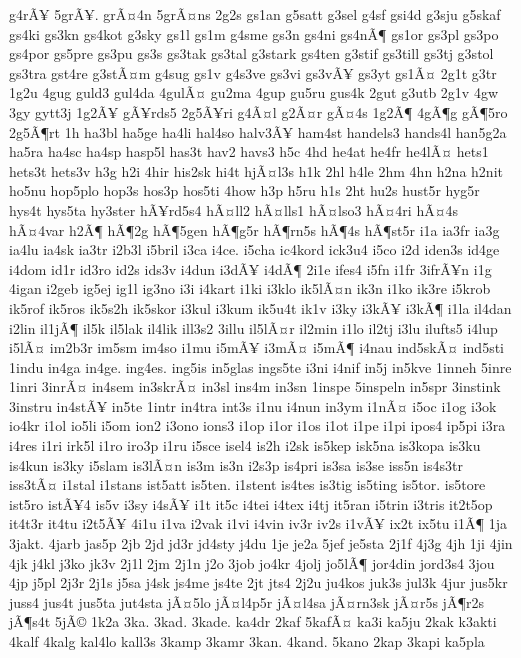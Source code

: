 {g4rÃ¥
5grÃ¥.
grÃ¤4n
5grÃ¤ns
2g2s
gs1an
g5satt
g3sel
g4sf
gsi4d
g3sju
g5skaf
gs4ki
gs3kn
gs4kot
g3sky
gs1l
gs1m
g4sme
gs3n
gs4ni
gs4nÃ¶
gs1or
gs3pl
gs3po
gs4por
gs5pre
gs3pu
gs3s
gs3tak
gs3tal
g3stark
gs4ten
g3stif
gs3till
gs3tj
g3stol
gs3tra
gst4re
g3stÃ¤m
g4sug
gs1v
g4s3ve
gs3vi
gs3vÃ¥
gs3yt
gs1Ã¤
2g1t
g3tr
1g2u
4gug
guld3
gul4da
4gulÃ¤
gu2ma
4gup
gu5ru
gus4k
2gut
g3utb
2g1v
4gw
3gy
gytt3j
1g2Ã¥
gÃ¥rds5
2g5Ã¥ri
g4Ã¤l
g2Ã¤r
gÃ¤4s
1g2Ã¶
4gÃ¶g
gÃ¶5ro
2g5Ã¶rt
1h
ha3bl
ha5ge
ha4li
hal4so
halv3Ã¥
ham4st
handels3
hands4l
han5g2a
ha5ra
ha4sc
ha4sp
hasp5l
has3t
hav2
havs3
h5c
4hd
he4at
he4fr
he4lÃ¤
hets1
hets3t
hets3v
h3g
h2i
4hir
his2sk
hi4t
hjÃ¤l3s
h1k
2hl
h4le
2hm
4hn
h2na
h2nit
ho5nu
hop5plo
hop3s
hos3p
hos5ti
4how
h3p
h5ru
h1s
2ht
hu2s
hust5r
hyg5r
hys4t
hys5ta
hy3ster
hÃ¥rd5s4
hÃ¤ll2
hÃ¤lls1
hÃ¤lso3
hÃ¤4ri
hÃ¤4s
hÃ¤4var
h2Ã¶
hÃ¶2g
hÃ¶5gen
hÃ¶g5r
hÃ¶rn5s
hÃ¶4s
hÃ¶st5r
i1a
ia3fr
ia3g
ia4lu
ia4sk
ia3tr
i2b3l
i5bril
i3ca
i4ce.
i5cha
ic4kord
ick3u4
i5co
i2d
iden3s
id4ge
i4dom
id1r
id3ro
id2s
ids3v
i4dun
i3dÃ¥
i4dÃ¶
2i1e
ifes4
i5fn
i1fr
3ifrÃ¥n
i1g
4igan
i2geb
ig5ej
ig1l
ig3no
i3i
i4kart
i1ki
i3klo
ik5lÃ¤n
ik3n
i1ko
ik3re
i5krob
ik5rof
ik5ros
ik5s2h
ik5skor
i3kul
i3kum
ik5u4t
ik1v
i3ky
i3kÃ¥
i3kÃ¶
i1la
il4dan
i2lin
il1jÃ¶
il5k
il5lak
il4lik
ill3s2
3illu
il5lÃ¤r
il2min
i1lo
il2tj
i3lu
ilufts5
i4lup
i5lÃ¤
im2b3r
im5sm
im4so
i1mu
i5mÃ¥
i3mÃ¤
i5mÃ¶
i4nau
ind5skÃ¤
ind5sti
1indu
in4ga
in4ge.
ing4es.
ing5is
in5glas
ings5te
i3ni
i4nif
in5j
in5kve
1inneh
5inre
1inri
3inrÃ¤
in4sem
in3skrÃ¤
in3sl
ins4m
in3sn
1inspe
5inspeln
in5spr
3instink
3instru
in4stÃ¥
in5te
1intr
in4tra
int3s
i1nu
i4nun
in3ym
i1nÃ¤
i5oc
i1og
i3ok
io4kr
i1ol
io5li
i5om
ion2
i3ono
ions3
i1op
i1or
i1os
i1ot
i1pe
i1pi
ipos4
ip5pi
i3ra
i4res
i1ri
irk5l
i1ro
iro3p
i1ru
i5sce
isel4
is2h
i2sk
is5kep
isk5na
is3kopa
is3ku
is4kun
is3ky
i5slam
is3lÃ¤n
is3m
is3n
i2s3p
is4pri
is3sa
is3se
iss5n
is4s3tr
iss3tÃ¤
i1stal
i1stans
ist5att
is5ten.
i1stent
is4tes
is3tig
is5ting
is5tor.
is5tore
ist5ro
istÃ¥4
is5v
i3sy
i4sÃ¥
i1t
it5c
i4tei
i4tex
i4tj
it5ran
i5trin
i3tris
it2t5op
it4t3r
it4tu
i2t5Ã¥
4i1u
i1va
i2vak
i1vi
i4vin
iv3r
iv2s
i1vÃ¥
ix2t
ix5tu
i1Ã¶
1ja
3jakt.
4jarb
jas5p
2jb
2jd
jd3r
jd4sty
j4du
1je
je2a
5jef
je5sta
2j1f
4j3g
4jh
1ji
4jin
4jk
j4kl
j3ko
jk3v
2j1l
2jm
2j1n
j2o
3job
jo4kr
4jolj
jo5lÃ¶
jor4din
jord3s4
3jou
4jp
j5pl
2j3r
2j1s
j5sa
j4sk
js4me
js4te
2jt
jts4
2j2u
ju4kos
juk3s
jul3k
4jur
jus5kr
juss4
jus4t
jus5ta
jut4sta
jÃ¤5lo
jÃ¤l4p5r
jÃ¤l4sa
jÃ¤rn3sk
jÃ¤r5s
jÃ¶r2s
jÃ¶s4t
5jÃ©
1k2a
3ka.
3kad.
3kade.
ka4dr
2kaf
5kafÃ¤
ka3i
ka5ju
2kak
k3akti
4kalf
4kalg
kal4lo
kall3s
3kamp
3kamr
3kan.
4kand.
5kano
2kap
3kapi
ka5pla
}
